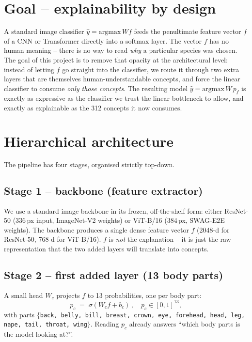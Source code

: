 \documentclass[10pt,conference,twocolumn,a4paper]{article}
\begin{document}
\section{Goal -- explainability by design}\label{sec:goal}
A standard image classifier $\hat y = \mathrm{argmax}\,W f$ feeds the
penultimate feature vector $f$ of a CNN or Transformer directly into a
softmax layer. The vector $f$ has no human meaning -- there is no way to
read \emph{why} a particular species was chosen. The goal of this project
is to remove that opacity at the architectural level: instead of letting
$f$ go straight into the classifier, we route it through two extra layers
that are themselves human-understandable concepts, and force the linear
classifier to consume \emph{only those concepts}. The resulting model
$\hat y = \mathrm{argmax}\,W\,p_f$ is exactly as expressive as the
classifier we trust the linear bottleneck to allow, and exactly as
explainable as the 312 concepts it now consumes.

\section{Hierarchical architecture}\label{sec:arch}
The pipeline has four stages, organised strictly top-down.

\subsection{Stage 1 -- backbone (feature extractor)}
We use a standard image backbone in its frozen, off-the-shelf form: either
ResNet-50 (336\,px input, ImageNet-V2 weights) or ViT-B/16 (384\,px,
SWAG-E2E weights). The backbone produces a single dense feature vector
$f$ (2048-d for ResNet-50, 768-d for ViT-B/16). $f$ is \emph{not} the
explanation -- it is just the raw representation that the two added layers
will translate into concepts.

\subsection{Stage 2 -- first added layer (13 body parts)}
A small head $W_c$ projects $f$ to 13 probabilities, one per body part:
\[
p_c \;=\; \sigma(W_c f + b_c)\,, \quad p_c\in[0,1]^{13},
\]
with parts $\{$\texttt{back, belly, bill, breast, crown, eye, forehead,
head, leg, nape, tail, throat, wing}$\}$. Reading $p_c$ already answers ``which body parts is the model looking at?''.
\end{document}
